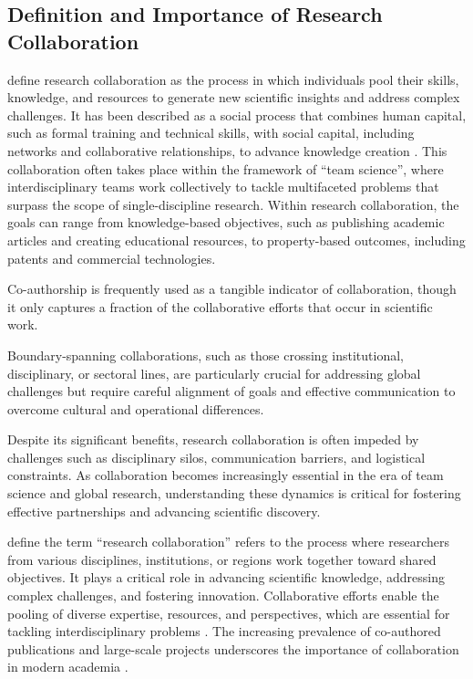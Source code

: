 \subsection*{Definition and Importance of Research Collaboration}
\textcite{Bozeman2014} define research collaboration as the process in which individuals pool their skills, knowledge, and resources to generate new scientific insights and address complex challenges.
It has been described as a social process that combines human capital, such as formal training and technical skills, with social capital, including networks and collaborative relationships, to advance knowledge creation \cite{Bozeman2014}.
This collaboration often takes place within the framework of ``team science'', where interdisciplinary teams work collectively to tackle multifaceted problems that surpass the scope of single-discipline research.
Within research collaboration, the goals can range from knowledge-based objectives, such as publishing academic articles and creating educational resources, to property-based outcomes, including patents and commercial technologies.

Co-authorship is frequently used as a tangible indicator of collaboration, though it only captures a fraction of the collaborative efforts that occur in scientific work.

Boundary-spanning collaborations, such as those crossing institutional, disciplinary, or sectoral lines, are particularly crucial for addressing global challenges but require careful alignment of goals and effective communication to overcome cultural and operational differences.

Despite its significant benefits, research collaboration is often impeded by challenges such as disciplinary silos, communication barriers, and logistical constraints.
As collaboration becomes increasingly essential in the era of team science and global research, understanding these dynamics is critical for fostering effective partnerships and advancing scientific discovery.

\textcite{KATZ19971} define the term ``research collaboration'' refers to the process where researchers from various disciplines, institutions, or regions work together toward shared objectives.
It plays a critical role in advancing scientific knowledge, addressing complex challenges, and fostering innovation.
Collaborative efforts enable the pooling of diverse expertise, resources, and perspectives, which are essential for tackling interdisciplinary problems \cite{KATZ19971}.
The increasing prevalence of co-authored publications and large-scale projects underscores the importance of collaboration in modern academia \cite{Adams2012}.

